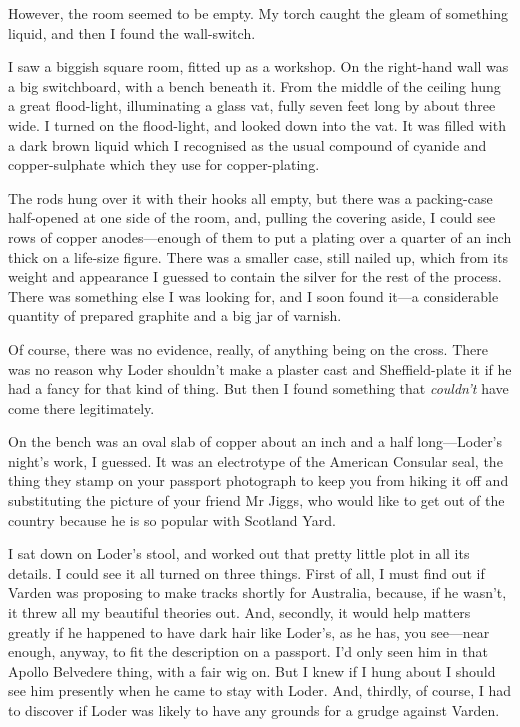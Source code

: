 However, the room seemed to be empty. My torch caught the gleam of something liquid, and then I found the wall-switch.

I saw a biggish square room, fitted up as a workshop. On the right-hand wall was a big switchboard, with a bench beneath it. From the middle of the ceiling hung a great flood-light, illuminating a glass vat, fully seven feet long by about three wide. I turned on the flood-light, and looked down into the vat. It was filled with a dark brown liquid which I recognised as the usual compound of cyanide and copper-sulphate which they use for copper-plating.

The rods hung over it with their hooks all empty, but there was a packing-case half-opened at one side of the room, and, pulling the covering aside, I could see rows of copper anodes—enough of them to put a plating over a quarter of an inch thick on a life-size figure. There was a smaller case, still nailed up, which from its weight and appearance I guessed to contain the silver for the rest of the process. There was something else I was looking for, and I soon found it—a considerable quantity of prepared graphite and a big jar of varnish.

Of course, there was no evidence, really, of anything being on the cross. There was no reason why Loder shouldn't make a plaster cast and Sheffield-plate it if he had a fancy for that kind of thing. But then I found something that \textit{couldn't} have come there legitimately.

On the bench was an oval slab of copper about an inch and a half long—Loder's night's work, I guessed. It was an electrotype of the American Consular seal, the thing they stamp on your passport photograph to keep you from hiking it off and substituting the picture of your friend Mr Jiggs, who would like to get out of the country because he is so popular with Scotland Yard.

I sat down on Loder's stool, and worked out that pretty little plot in all its details. I could see it all turned on three things. First of all, I must find out if Varden was proposing to make tracks shortly for Australia, because, if he wasn't, it threw all my beautiful theories out. And, secondly, it would help matters greatly if he happened to have dark hair like Loder's, as he has, you see—near enough, anyway, to fit the description on a passport. I'd only seen him in that Apollo Belvedere thing, with a fair wig on. But I knew if I hung about I should see him presently when he came to stay with Loder. And, thirdly, of course, I had to discover if Loder was likely to have any grounds for a grudge against Varden.

